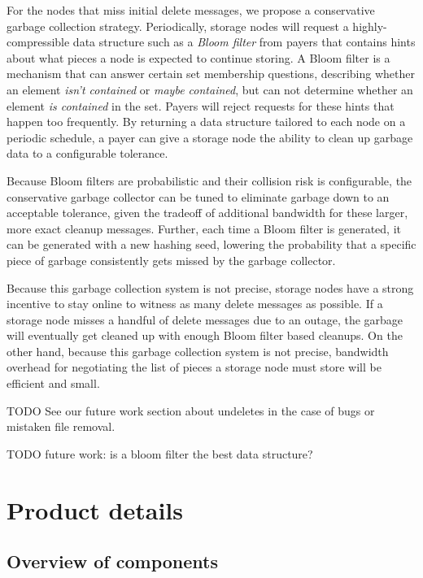 \documentclass[a4paper,10pt]{article} \usepackage[utf8]{inputenc}
\newcommand{\todo}[1]{{\color{red} TODO #1 }}
\begin{document}
For the nodes that miss initial delete messages, we propose a conservative
garbage collection strategy. Periodically, storage nodes will request
a highly-compressible data structure such as a
{\em Bloom filter} \cite{bloom-filter} from payers that contains hints about
what pieces a node is expected to continue storing.
A Bloom filter is a mechanism that can
answer certain set membership questions, describing whether an element
{\em isn't contained} or
{\em maybe contained}, but can not determine whether an element 
{\em is contained} in the set. 
Payers will reject
requests for these hints that happen too frequently. By returning a data
structure tailored to each node on a periodic schedule, a payer can give a
storage node the ability to clean up garbage data to a configurable tolerance.

Because Bloom filters are probabilistic and their collision risk is
configurable, the conservative garbage collector can be tuned to eliminate
garbage down to an acceptable tolerance, given the tradeoff of additional
bandwidth for these larger, more exact cleanup messages. Further, each time a
Bloom filter is generated, it can be generated with a new hashing seed, lowering
the probability that a specific piece of garbage consistently gets 
missed by the garbage collector.

Because this garbage collection system is not precise, storage nodes have a
strong incentive to stay online to witness as many delete messages as possible.
If a storage node misses a handful of delete messages due to an outage, the
garbage will eventually get cleaned up with enough Bloom filter based cleanups.
On the other hand, because this garbage collection system is not precise,
bandwidth overhead for negotiating the list of pieces a storage node must store
will be efficient and small.

\todo{See our future work section about undeletes in
the case of bugs or mistaken file removal.}

\todo{future work: is a bloom filter the best data structure?}

\section{Product details}\label{sec:product_details}

\subsection{Overview of components}
\end{document}

